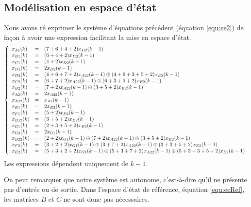 \subsection{Modélisation en espace d'état}
Nous avons ré exprimer le système d'équations précédent (équation \ref{equ:ee2}) de façon à avoir une expression facilitant la mise en espace d'état.
\begin{equation}
\label{equ:ee3}
\left\lbrace
\begin{array}{l c l}
x_{A1}(k) &=&	(7+6+4+2)x_{D2}(k-1)\\ 
x_{B1}(k) &=&	(6+4+2)x_{D2}(k-1)\\
x_{C1}(k) &=& 	(4+2)x_{D2}(k-1)\\
x_{D1}(k) &=&	2x_{D2}(k-1)\\
x_{D2}(k) &=&	(4+6+7+2)x_{A22}(k-1) \oplus  (4+6+3+5+2)x_{E2}(k-1)\\
x_{C2}(k) &=&	(6+7+2)x_{A22}(k-1) \oplus  (6+3+5+2)x_{E2}(k-1)\\
x_{B2}(k) &=&	(7+2)x_{A22}(k-1) \oplus  (3+5+2)x_{E2}(k-1)\\
x_{A2}(k) &=&	2x_{A22}(k-1)\\
x_{A22}(k) &=&	x_{A1}(k-1)\\
x_{E1}(k) &=&	2x_{E2}(k-1)\\
x_{F1}(k) &=&	(5+2)x_{E2}(k-1)\\
x_{B12}(k) &=&	(3+5+2)x_{E2}(k-1)\\
x_{G1}(k) &=&	(2+3+5+2)x_{E2}(k-1)\\
x_{G2}(k) &=&	2x_{G1}(k-1)\\
x_{B22}(k) &=&	(2+2)x_{G1}(k-1) \oplus (7+2)x_{A22}(k-1) \oplus  (3+5+2)x_{E2}(k-1)\\
x_{F2}(k) &=&	(3+2+2)x_{G1}(k-1) \oplus (3+7+2)x_{A22}(k-1) \oplus  (3+3+5+2)x_{E2}(k-1)\\
x_{E2}(k) &=&	(5+3+2+2)x_{G1}(k-1) \oplus (5+3+7+2)x_{A22}(k-1) \oplus  (5+3+3+5+2)x_{E2}(k-1)   \\  
\end{array}
\right. 
\end{equation}
Les expressions dépendent uniquement de $k-1$.



On peut remarquer que notre système est autonome, c'est-à-dire qu'il ne présente pas d'entrée ou de sortie. 
Dans l'espace d'état de référence, équation \ref{equ:eeRef}, les matrices $B$ et $C$ ne sont donc pas nécessaires.

